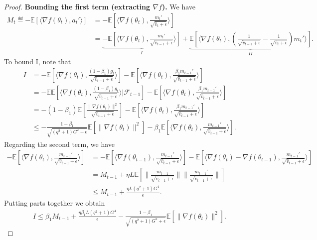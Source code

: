\documentclass[11pt]{article}
\begin{document}
\begin{proof}
\textbf{Bounding the first term (extracting $\nabla f$).} We have
\begin{align*}
    M_t\eqdef -\mathbb E[\langle \nabla f(\theta_t), a_t'\rangle]&=-\mathbb E[\langle \nabla f(\theta_t), \frac{m_t'}{\sqrt{\hat v_t+\epsilon}}\rangle]\\
    &=\underbrace{-\mathbb E[\langle \nabla f(\theta_t), \frac{m_t'}{\sqrt{\hat v_{t-1}+\epsilon}} \rangle]}_{I}+\underbrace{\mathbb E[\langle \nabla f(\theta_t), (\frac{1}{\sqrt{\hat v_{t-1}+\epsilon}}-\frac{1}{\sqrt{\hat v_t+\epsilon}})m_t' \rangle]}_{II}.
\end{align*}
To bound I, note that
\begin{align*}
    I&=-\mathbb E[\langle \nabla f(\theta_t), \frac{(1-\beta_1)g_t}{\sqrt{\hat v_{t-1}+\epsilon}} \rangle] -\mathbb E[\langle \nabla f(\theta_t), \frac{\beta_1 m_{t-1}'}{\sqrt{\hat v_{t-1}+\epsilon}} \rangle]\\
    &=-\mathbb E\mathbb E[\langle \nabla f(\theta_t), \frac{(1-\beta_1)g_t}{\sqrt{\hat v_{t-1}+\epsilon}} \rangle|\mathcal F_{t-1}] -\mathbb E[\langle \nabla f(\theta_t), \frac{\beta_1 m_{t-1}'}{\sqrt{\hat v_{t-1}+\epsilon}} \rangle]\\
    &=-(1-\beta_1)\mathbb E[\frac{\|\nabla f(\theta_t)\|^2}{\sqrt{\hat v_{t-1}+\epsilon}}] - \mathbb E[\langle \nabla f(\theta_t), \frac{\beta_1 m_{t-1}'}{\sqrt{\hat v_{t-1}+\epsilon}} \rangle]\\
    &\leq -\frac{1-\beta_1}{\sqrt{(q^2+1)G^2+\epsilon}}\mathbb E[\|\nabla f(\theta_t)\|^2]- \beta_1\mathbb E[\langle \nabla f(\theta_t), \frac{ m_{t-1}'}{\sqrt{\hat v_{t-1}+\epsilon}} \rangle].
\end{align*}
Regarding the second term, we have
\begin{align*}
    - \mathbb E[\langle \nabla f(\theta_t), \frac{ m_{t-1}'}{\sqrt{\hat v_{t-1}+\epsilon}} \rangle]&=-\mathbb E[\langle\nabla f(\theta_{t-1}), \frac{ m_{t-1}'}{\sqrt{\hat v_{t-1}+\epsilon}} \rangle]- \mathbb E[\langle \nabla f(\theta_t)-\nabla f(\theta_{t-1}), \frac{ m_{t-1}'}{\sqrt{\hat v_{t-1}+\epsilon}} \rangle]\\
    &=M_{t-1}+ \eta L\mathbb E[\|\frac{m_{t-1}}{\sqrt{\hat v_{t-1}+\epsilon}}\| \|\frac{m_{t-1}'}{\sqrt{\hat v_{t-1}+\epsilon}}\|]\\
    &\leq M_{t-1}+\frac{\eta L(q^2+1)G^4}{\epsilon}.
\end{align*}
Putting parts together we obtain
\begin{align*}
    I\leq \beta_1 M_{t-1}+\frac{\eta \beta_1 L(q^2+1)G^4}{\epsilon}-\frac{1-\beta_1}{\sqrt{(q^2+1)G^2+\epsilon}}\mathbb E[\|\nabla f(\theta_t)\|^2].

\end{align*}
\end{proof}
\end{document}
